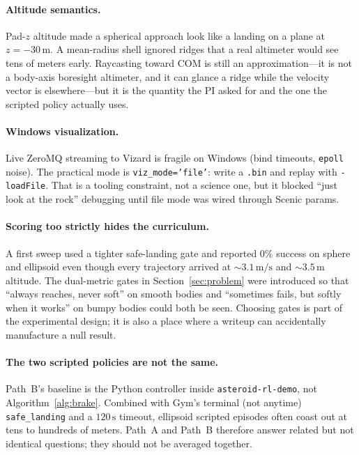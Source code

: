 \documentclass[10pt]{article}
\begin{document}
\paragraph{Altitude semantics.}
Pad-$z$ altitude made a spherical approach look like a landing on a plane at $z=-30\,\mathrm{m}$.
A mean-radius shell ignored ridges that a real altimeter would see tens of meters early.
Raycasting toward COM is still an approximation---it is not a body-axis boresight altimeter, and it can glance a ridge while the velocity vector is elsewhere---but it is the quantity the PI asked for and the one the scripted policy actually uses.

\paragraph{Windows visualization.}
Live ZeroMQ streaming to Vizard is fragile on Windows (bind timeouts, \texttt{epoll} noise).
The practical mode is \texttt{viz\_mode='file'}: write a \texttt{.bin} and replay with \texttt{-loadFile}.
That is a tooling constraint, not a science one, but it blocked ``just look at the rock'' debugging until file mode was wired through Scenic params.

\paragraph{Scoring too strictly hides the curriculum.}
A first sweep used a tighter safe-landing gate and reported $0\%$ success on sphere and ellipsoid even though every trajectory arrived at $\sim\!3.1\,\mathrm{m/s}$ and $\sim\!3.5\,\mathrm{m}$ altitude.
The dual-metric gates in Section~\ref{sec:problem} were introduced so that ``always reaches, never soft'' on smooth bodies and ``sometimes fails, but softly when it works'' on bumpy bodies could both be seen.
Choosing gates is part of the experimental design; it is also a place where a writeup can accidentally manufacture a null result.

\paragraph{The two scripted policies are not the same.}
Path~B's baseline is the Python controller inside \texttt{asteroid-rl-demo}, not Algorithm~\ref{alg:brake}.
Combined with Gym's terminal (not anytime) \texttt{safe\_landing} and a $120\,\mathrm{s}$ timeout, ellipsoid scripted episodes often coast out at tens to hundreds of meters.
Path~A and Path~B therefore answer related but not identical questions; they should not be averaged together.
\end{document}
